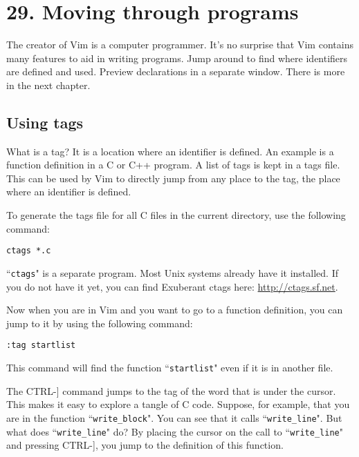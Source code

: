 \section{29. Moving through programs}
The creator of Vim is a computer programmer.
It's no surprise that Vim contains many features to aid in writing programs.
Jump around to find where identifiers are defined and used.
Preview declarations in a separate window.
There is more in the next chapter.
\localtableofcontents
\subsection{Using tags}
\label{Using tags}
What is a tag?  It is a location where an identifier is defined.
An example is a function definition in a C or C++ program.
A list of tags is kept in a tags file.
This can be used by Vim to directly jump from any place to the tag, the place where an identifier is defined.

To generate the tags file for all C files in the current directory, use the following command:

\begin{Verbatim}[samepage=true]
 ctags *.c
\end{Verbatim}

``\texttt{ctags}" is a separate program.
Most Unix systems already have it installed.
If you do not have it yet, you can find Exuberant ctags here: \url{http://ctags.sf.net}.

Now when you are in Vim and you want to go to a function definition, you can jump to it by using the following command:

\begin{Verbatim}[samepage=true]
 :tag startlist
\end{Verbatim}

This command will find the function ``\texttt{startlist}" even if it is in another file.

The CTRL-] command jumps to the tag of the word that is under the cursor.
This makes it easy to explore a tangle of C code.
Suppose, for example, that you are in the function ``\texttt{write\_block}".
You can see that it calls ``\texttt{write\_line}".
But what does ``\texttt{write\_line}" do?  By placing the cursor on the call to ``\texttt{write\_line}" and pressing CTRL-], you jump to the definition of this function.

